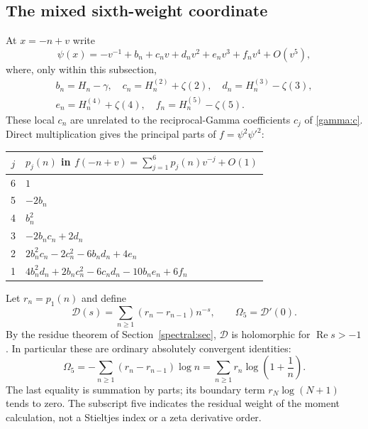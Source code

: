 \documentclass[11pt,a4paper]{article}
\numberwithin{equation}{section}
\theoremstyle{definition}
\theoremstyle{remark}
\newcommand{\re}{\operatorname{Re}}
\begin{document}
\subsection{The mixed sixth-weight coordinate}

At $x=-n+v$ write
\[
 \psi(x)=-v^{-1}+b_n+c_nv+d_nv^2+e_nv^3+f_nv^4+O(v^5),
\]
where, only within this subsection,
\begin{equation}\label{sixth:locals}
 \begin{gathered}
 b_n=H_n-\gamma,\quad c_n=H_n^{(2)}+\zeta(2),\quad
 d_n=H_n^{(3)}-\zeta(3),\\
 e_n=H_n^{(4)}+\zeta(4),\quad f_n=H_n^{(5)}-\zeta(5).
 \end{gathered}
\end{equation}
These local $c_n$ are unrelated to the reciprocal-Gamma coefficients
$c_j$ of \eqref{gamma:c}.  Direct multiplication gives the principal
parts of $f=\psi^2\psi'^2$:
\begin{center}
\begin{tabular}{@{}cl@{}}
\toprule
$j$ & $p_j(n)$ in $f(-n+v)=\sum_{j=1}^6p_j(n)v^{-j}+O(1)$ \\
\midrule
6 & $1$ \\
5 & $-2b_n$ \\
4 & $b_n^2$ \\
3 & $-2b_nc_n+2d_n$ \\
2 & $2b_n^2c_n-2c_n^2-6b_nd_n+4e_n$ \\
1 & $4b_n^2d_n+2b_nc_n^2-6c_nd_n-10b_ne_n+6f_n$ \\
\bottomrule
\end{tabular}
\end{center}
Let $r_n=p_1(n)$ and define
\begin{equation}\label{sixth:D}
 \mathcal D(s)=\sum_{n\ge1}(r_n-r_{n-1})n^{-s},\qquad
 \Omega_5=\mathcal D'(0).
\end{equation}
By the residue theorem of Section~\ref{spectral:sec}, $\mathcal D$
is holomorphic for $\re s>-1$.  In particular these are ordinary
absolutely convergent identities:
\begin{equation}\label{sixth:omega-series}
 \boxed{\displaystyle
 \Omega_5=-\sum_{n\ge1}(r_n-r_{n-1})\log n
             =\sum_{n\ge1}r_n\log\left(1+\frac1n\right).}
\end{equation}
The last equality is summation by parts; its boundary term
$r_N\log(N+1)$ tends to zero.
The subscript five indicates the residual weight of the moment
calculation, not a Stieltjes index or a zeta derivative order.
\end{document}
